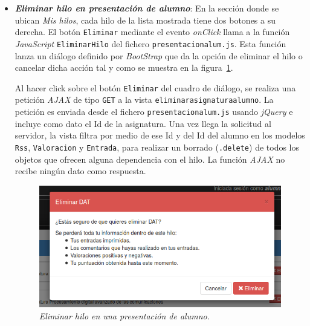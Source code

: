 \documentclass[a4paper, 12pt]{book}
\begin{document}
\begin{itemize}
  \item {\bfseries \textit{Eliminar hilo en presentaci\'on de alumno}}: En la secci\'on donde se ubican \textit{Mis hilos}, cada hilo de la lista mostrada 
  tiene dos botones a su derecha. El bot\'on \texttt{Eliminar} mediante el evento \textit{onClick} llama a la funci\'on \textit{JavaScript} 
  \texttt{EliminarHilo} del fichero \texttt{presentacionalum.js}. Esta funci\'on lanza un di\'alogo definido por \textit{BootStrap} que da la opci\'on de
  eliminar el hilo o cancelar dicha acci\'on tal y como se muestra en la figura~\ref{fig:eliminarhiloalumno}. 
  
  Al hacer click sobre el bot\'on \texttt{Eliminar} del cuadro de di\'alogo, se realiza una petici\'on \textit{AJAX} de tipo \texttt{GET} a la vista 
  \texttt{eliminarasignaturaalumno}. La petici\'on es enviada desde el fichero \texttt{presentacionalum.js} usando \textit{jQuery} e incluye como dato el 
  Id de la asignatura. Una vez llega la solicitud al servidor, la vista filtra por medio de ese Id y del Id del alumno en los modelos \texttt{Rss}, 
  \texttt{Valoracion} y \texttt{Entrada}, para realizar un borrado (\texttt{.delete}) de todos los objetos que ofrecen alguna dependencia con el hilo. La 
  funci\'on \textit{AJAX} no recibe ning\'un dato como respuesta.
  
  \begin{figure}
    \centering
    \includegraphics[width=17cm, keepaspectratio]{imagenes/PresentacionAlumnoEliminarHilo}
    \caption{\textit{Eliminar hilo en una presentaci\'on de alumno.}}
    \label{fig:eliminarhiloalumno}
  \end{figure}


\end{itemize}
\end{document}
